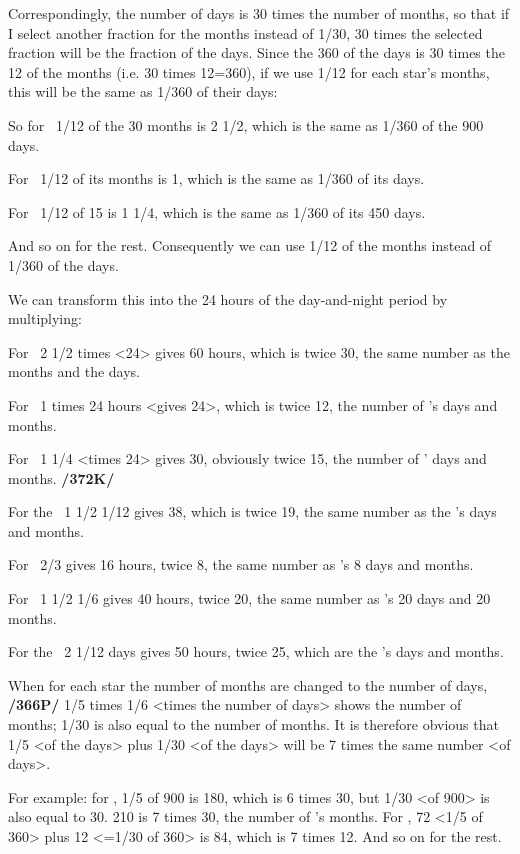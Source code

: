 Correspondingly, the number of days is 30 times the number of months, so that if I select another fraction for the months instead of 1/30, 30 times the selected fraction will be the fraction of the days. Since the 360 of the days is 30 times the 12 of the months (i.e. 30 times 12=360), if we use 1/12 for each star’s months, this will be the same as 1/360 of their days:

So for \Saturn\, 1/12 of the 30 months is 2 1/2, which is the same as 1/360 of the 900 days.

For \Jupiter\, 1/12 of its months is 1, which is the same as 1/360 of its days.

For \Mars\, 1/12 of 15 is 1 1/4, which is the same as 1/360 of its 450 days.

And so on for the rest. Consequently we can use 1/12 of the months instead of 1/360 of the days. 

We can transform this into the 24 hours of the day-and-night period by multiplying:

For \Saturn\, 2 1/2 times <24> gives 60 hours, which is twice 30, the same number as the months and the days.

For \Jupiter\, 1 times 24 hours <gives 24>, which is twice 12, the number of \Jupiter’s days and months.

For \Mars\, 1 1/4 <times 24> gives 30, obviously twice 15, the number of \Mars’ days and months. \textbf{/372K/} 

For the \Sun\, 1 1/2 1/12 gives 38, which is twice 19, the same number as the \Sun’s days and months.

For \Venus\, 2/3 gives 16 hours, twice 8, the same number as \Venus’s 8 days and months.

For \Mercury\, 1 1/2 1/6 gives 40 hours, twice 20, the same number as \Mercury’s 20 days and 20 months.

For the \Moon\, 2 1/12 days gives 50 hours, twice 25, which are the \Moon’s days and months.

When for each star the number of months are changed to the number of days, \textbf{/366P/} 1/5 times 1/6 <times the number of days> shows the number of months; 1/30 is also equal to the number of months. It is therefore obvious that 1/5 <of the days> plus 1/30 <of the days> will be 7 times the same number <of
days>. 

For example: for \Saturn, 1/5 of 900 is 180, which is 6 times 30, but 1/30 <of 900> is also equal to 30. 210 is 7 times 30, the number of \Saturn’s months. For \Jupiter, 72 <1/5 of 360> plus 12 <=1/30
of 360> is 84, which is 7 times 12. And so on for the rest.

